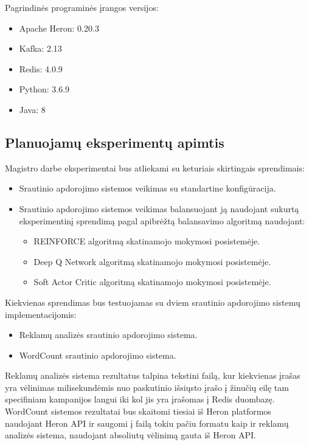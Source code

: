 \documentclass{VUMIFPSbakalaurinis}
\begin{document}
Pagrindinės programinės įrangos versijos:
\begin{itemize}
    \item Apache Heron: 0.20.3
    \item Kafka: 2.13
    \item Redis: 4.0.9
    \item Python: 3.6.9
    \item Java: 8
\end{itemize}
\subsection{Planuojamų eksperimentų apimtis}

Magistro darbe eksperimentai bus atliekami su keturiais skirtingais sprendimais:
\begin{itemize}
    \item Srautinio apdorojimo sistemos veikimas su standartine konfigūracija.
    \item Srautinio apdorojimo sistemos veikimas balansuojant ją naudojant sukurtą eksperimentinį sprendimą pagal apibrėžtą balansavimo algoritmą naudojant:
    \begin{itemize}
        \item REINFORCE algoritmą skatinamojo mokymosi posistemėje.
        \item Deep Q Network algoritmą skatinamojo mokymosi posistemėje.
        \item Soft Actor Critic algoritmą skatinamojo mokymosi posistemėje.
    \end{itemize}
\end{itemize}

Kiekvienas sprendimas bus testuojamas su dviem srautinio apdorojimo sistemų implementacijomis:
\begin{itemize}
    \item Reklamų analizės srautinio apdorojimo sistema.
    \item WordCount srautinio apdorojimo sistema.
\end{itemize}

Reklamų analizės sistema rezultatus talpina tekstini failą, kur kiekvienas įrašas yra vėlinimas milisekundėmis nuo paskutinio išsiųsto įrašo į žinučių eilę tam specifiniam kampanijos langui iki kol jis yra įrašomas į Redis duombazę. WordCount sistemos rezultatai bus skaitomi tiesiai iš Heron platformos naudojant Heron API ir saugomi į failą tokiu pačiu formatu kaip ir reklamų analizės sistema, naudojant absoliutų vėlinimą gauta iš Heron API. 
\end{document}
